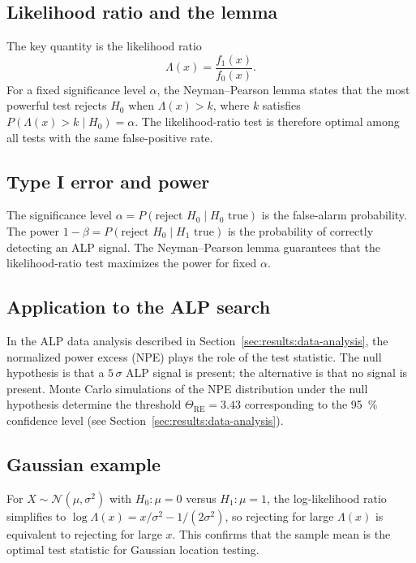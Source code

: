 \subsection{Likelihood ratio and the lemma}

The key quantity is the likelihood ratio
\[
\Lambda(x) = \frac{f_1(x)}{f_0(x)}.
\]
For a fixed significance level $\alpha$, the Neyman--Pearson lemma states that the most powerful test rejects $H_0$ when $\Lambda(x) > k$, where $k$ satisfies $P(\Lambda(x)>k\mid H_0)=\alpha$.
The likelihood-ratio test is therefore optimal among all tests with the same false-positive rate.

\subsection{Type I error and power}

The significance level $\alpha = P(\text{reject }H_0\mid H_0\text{ true})$ is the false-alarm probability.
The power $1-\beta = P(\text{reject }H_0\mid H_1\text{ true})$ is the probability of correctly detecting an ALP signal.
The Neyman--Pearson lemma guarantees that the likelihood-ratio test maximizes the power for fixed $\alpha$.

\subsection{Application to the ALP search}

In the ALP data analysis described in Section~\ref{sec:results:data-analysis}, the normalized power excess (NPE) plays the role of the test statistic.
The null hypothesis is that a $5\,\sigma$ ALP signal is present; the alternative is that no signal is present.
Monte Carlo simulations of the NPE distribution under the null hypothesis determine the threshold $\Theta_\mathrm{RE} = 3.43$ corresponding to the \SI{95}{\%} confidence level (see Section~\ref{sec:results:data-analysis}).

\subsection{Gaussian example}

For $X\sim\mathcal{N}(\mu,\sigma^2)$ with $H_0:\mu=0$ versus $H_1:\mu=1$, the log-likelihood ratio simplifies to $\log\Lambda(x) = x/\sigma^2 - 1/(2\sigma^2)$, so rejecting for large $\Lambda(x)$ is equivalent to rejecting for large $x$.
This confirms that the sample mean is the optimal test statistic for Gaussian location testing.

